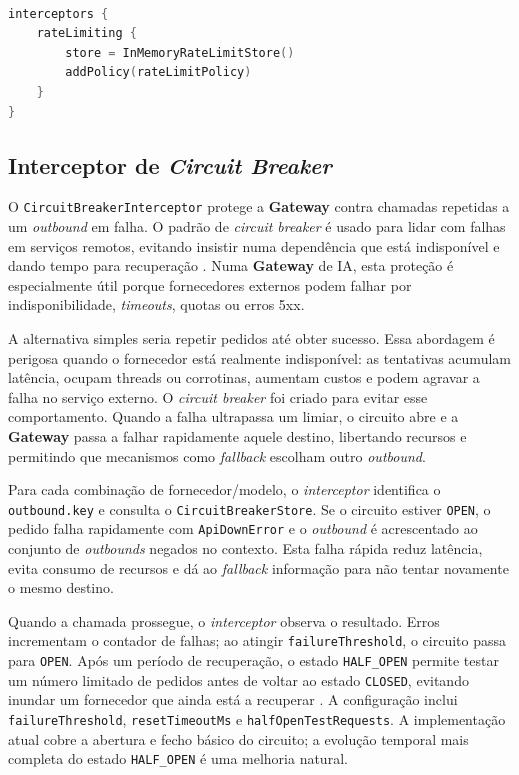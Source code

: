     \vspace{0.5em}
    \begin{lstlisting}[language=kotlin, caption={DSL de configuração do \textit{interceptor} de \textit{rate limiting}}]

interceptors {
    rateLimiting {
        store = InMemoryRateLimitStore()
        addPolicy(rateLimitPolicy)
    }
}
    \end{lstlisting}

    \subsection{Interceptor de \textit{Circuit Breaker}}
    O \texttt{CircuitBreakerInterceptor} protege a \textbf{Gateway} contra chamadas repetidas a um \textit{outbound} em falha. O padrão de \textit{circuit breaker} é usado para lidar com falhas em serviços remotos, evitando insistir numa dependência que está indisponível e dando tempo para recuperação \cite{microsoft_circuit_breaker,itau_circuit_breaker,treinaweb_circuit_breaker}. Numa \textbf{Gateway} de IA, esta proteção é especialmente útil porque fornecedores externos podem falhar por indisponibilidade, \textit{timeouts}, quotas ou erros 5xx.

    A alternativa simples seria repetir pedidos até obter sucesso. Essa abordagem é perigosa quando o fornecedor está realmente indisponível: as tentativas acumulam latência, ocupam threads ou corrotinas, aumentam custos e podem agravar a falha no serviço externo. O \textit{circuit breaker} foi criado para evitar esse comportamento. Quando a falha ultrapassa um limiar, o circuito abre e a \textbf{Gateway} passa a falhar rapidamente aquele destino, libertando recursos e permitindo que mecanismos como \textit{fallback} escolham outro \textit{outbound}.

    Para cada combinação de fornecedor/modelo, o \textit{interceptor} identifica o \texttt{outbound.key} e consulta o \texttt{CircuitBreakerStore}. Se o circuito estiver \texttt{OPEN}, o pedido falha rapidamente com \texttt{ApiDownError} e o \textit{outbound} é acrescentado ao conjunto de \textit{outbounds} negados no contexto. Esta falha rápida reduz latência, evita consumo de recursos e dá ao \textit{fallback} informação para não tentar novamente o mesmo destino.

    Quando a chamada prossegue, o \textit{interceptor} observa o resultado. Erros incrementam o contador de falhas; ao atingir \texttt{failureThreshold}, o circuito passa para \texttt{OPEN}. Após um período de recuperação, o estado \texttt{HALF\_OPEN} permite testar um número limitado de pedidos antes de voltar ao estado \texttt{CLOSED}, evitando inundar um fornecedor que ainda está a recuperar \cite{microsoft_circuit_breaker}. A configuração inclui \texttt{failureThreshold}, \texttt{resetTimeoutMs} e \texttt{halfOpenTestRequests}. A implementação atual cobre a abertura e fecho básico do circuito; a evolução temporal mais completa do estado \texttt{HALF\_OPEN} é uma melhoria natural.

